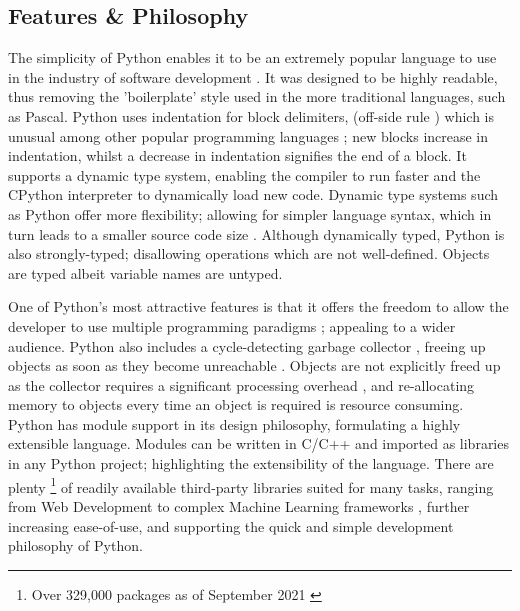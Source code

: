 		\subsection{Features \& Philosophy}
		\par The simplicity of Python enables it to be an extremely popular language to use in the industry of software development \cite[]{tiobe2022index}. It was designed to be highly readable, 
		thus removing the 'boilerplate' style used in the more traditional languages, such as Pascal. Python uses indentation for block delimiters,
		(off-side rule \cite[pp.4--5]{van2021python}) which is unusual among other popular programming languages \cite[pp.2--3]{van2021python}; new blocks increase in indentation, whilst a decrease in indentation signifies the end of 
		a block. It supports a dynamic type system, enabling the compiler to run faster and the CPython interpreter to dynamically load new code. 
		Dynamic type systems such as Python offer more flexibility; allowing for simpler language syntax, which in turn leads to a smaller source code size \cite[]{dynamic2013typing}. Although dynamically typed,
		Python is also strongly-typed; disallowing operations which are not well-defined. Objects are typed albeit variable names are untyped.
		\par One of Python's most attractive features is that it offers the freedom to allow the developer to use multiple programming paradigms \cite[]{van2007python}; appealing to a wider audience. Python
		also includes a cycle-detecting garbage collector \cite[]{van2007python}, freeing up objects as soon as they become unreachable \cite[pp.9--10]{van1994python}. Objects are not explicitly freed up
		as the collector requires a significant processing overhead \cite[pp.27-30]{zorn1990barrier}, and re-allocating memory to objects every time an object is required is resource consuming. Python has 
		module support in its design philosophy, formulating a highly extensible language. Modules can be written in C/C++ \cite[]{srinath2017python} and imported as libraries in any Python project;
		highlighting the extensibility of the language. There are plenty \footnote{Over 329,000 packages as of September 2021 \cite[]{van2007python}} of readily available 
		third-party libraries suited for many tasks, ranging from Web Development \cite[]{forcier2008python} to complex Machine Learning frameworks \cite[]{pedregosa2011scikit}, further increasing 
		ease-of-use, and supporting the quick and simple development philosophy of Python.

